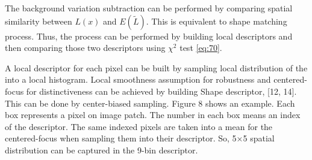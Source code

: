 \documentclass[conference]{IEEEtran}
\begin{document}
The background variation subtraction can be performed by comparing spatial similarity between \begin{math} L(x) \end{math}  and \begin{math} E(\tilde{L}) \end{math}. This is equivalent to shape matching process. Thus, the process can be performed by building local descriptors and then comparing those two descriptors using \begin{math} \chi ^2 \end{math} test \ref{eq:70}.

A local descriptor for each pixel can be built by sampling local distribution of the   into a local histogram. Local smoothness assumption for robustness and centered-focus for distinctiveness can be achieved by building Shape descriptor, [12, 14]. This can be done by center-biased sampling. Figure 8 shows an example. Each box represents a pixel on image patch. The number in each box means an index of the descriptor. The same indexed pixels are taken into a mean for the centered-focus when sampling them into their descriptor. So, 5×5 spatial distribution can be captured in the 9-bin descriptor. 
\end{document}
